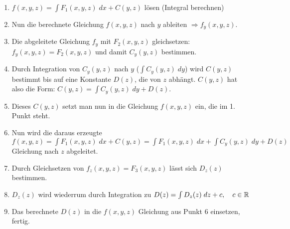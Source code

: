 \begin{enumerate}[itemsep=1em]
	\item $f(x,y,z) = \int F_1(x,y,z)\;dx + C(y,z)$ lösen (Integral berechnen)
	\item Nun die berechnete Gleichung $f(x,y,z)$ nach $y$ ableiten $\Rightarrow f_y(x,y,z)$.
	\item Die abgeleitete Gleichung $f_y$ mit $F_2(x,y,z)$ gleichsetzen: $f_y(x,y,z) = F_2(x,y,z)$
	und damit $C_y(y,z)$ bestimmen.
	\item Durch Integration von $C_y(y,z)$ nach $y$ ($\int C_y(y,z)\;dy$) wird $C(y,z)$ bestimmt
	bis auf eine Konstante $D(z)$, die von $z$ abhängt. $C(y,z)$ hat also die Form:
	$C(y,z) = \int C_y(y,z)\; dy + D(z)$.
	\item Dieses $C(y,z)$ setzt man nun in die Gleichung $f(x,y,z)$ ein, die im 1. Punkt steht.
	\item Nun wird die daraus erzeugte
	$f(x,y,z) = \int F_1(x,y,z)\;dx + C(y,z) = \int F_1(x,y,z)\;dx + \int C_y(y,z)\; dy + D(z)$
	Gleichung nach $z$ abgeleitet.
	\item Durch Gleichsetzen von $f_z(x,y,z) = F_3(x,y,z)$ lässt sich $D_z(z)$ bestimmen.
	\item $D_z(z)$ wird wiederrum durch Integration zu $D(z) = \int D_z(z)\; dz + c, \quad c \in \mathbb{R}$
	\item Das berechnete $D(z)$ in die $f(x,y,z)$ Gleichung aus Punkt 6 einsetzen, fertig.
\end{enumerate}



